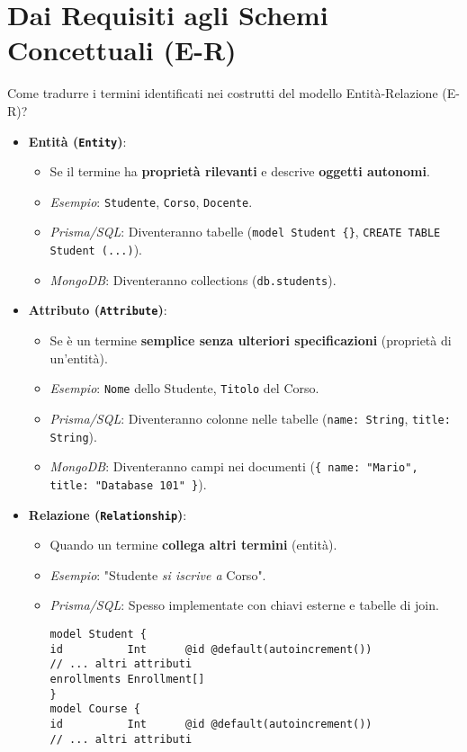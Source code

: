 \section{Dai Requisiti agli Schemi Concettuali (E-R)}
Come tradurre i termini identificati nei costrutti del modello Entità-Relazione (E-R)?
\begin{itemize}
	\item \textbf{Entità (\texttt{Entity})}:
	\begin{itemize}
		\item Se il termine ha \textbf{proprietà rilevanti} e descrive \textbf{oggetti autonomi}.
		\item \textit{Esempio}: \texttt{Studente}, \texttt{Corso}, \texttt{Docente}.
		\item \textit{Prisma/SQL}: Diventeranno tabelle (\texttt{model Student \{\}}, \texttt{CREATE TABLE Student (...)}).
		\item \textit{MongoDB}: Diventeranno collections (\texttt{db.students}).
	\end{itemize}
	\item \textbf{Attributo (\texttt{Attribute})}:
	\begin{itemize}
		\item Se è un termine \textbf{semplice senza ulteriori specificazioni} (proprietà di un'entità).
		\item \textit{Esempio}: \texttt{Nome} dello Studente, \texttt{Titolo} del Corso.
		\item \textit{Prisma/SQL}: Diventeranno colonne nelle tabelle (\texttt{name: String}, \texttt{title: String}).
		\item \textit{MongoDB}: Diventeranno campi nei documenti (\texttt{\{ name: "Mario", title: "Database 101" \}}).
	\end{itemize}
	\item \textbf{Relazione (\texttt{Relationship})}:
	\begin{itemize}
		\item Quando un termine \textbf{collega altri termini} (entità).
		\item \textit{Esempio}: "Studente \textit{si iscrive a} Corso".
		\item \textit{Prisma/SQL}: Spesso implementate con chiavi esterne e tabelle di join.
		\begin{verbatim}
model Student {
id          Int      @id @default(autoincrement())
// ... altri attributi
enrollments Enrollment[]
}
model Course {
id          Int      @id @default(autoincrement())
// ... altri attributi

\end{verbatim}
\end{itemize}
\end{itemize}
